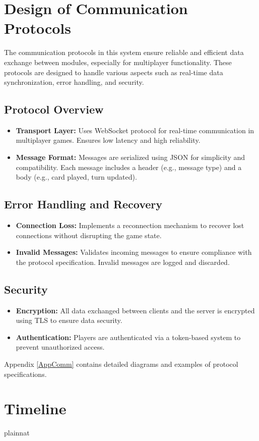 \documentclass[12pt, titlepage]{article}
\begin{document}
\section{Design of Communication Protocols}

The communication protocols in this system ensure reliable and efficient data exchange between modules, especially for multiplayer functionality. These protocols are designed to handle various aspects such as real-time data synchronization, error handling, and security.

\subsection{Protocol Overview}
\begin{itemize}
    \item \textbf{Transport Layer:} Uses WebSocket protocol for real-time communication in multiplayer games. Ensures low latency and high reliability.
    \item \textbf{Message Format:} Messages are serialized using JSON for simplicity and compatibility. Each message includes a header (e.g., message type) and a body (e.g., card played, turn updated).
\end{itemize}

\subsection{Error Handling and Recovery}
\begin{itemize}
    \item \textbf{Connection Loss:} Implements a reconnection mechanism to recover lost connections without disrupting the game state.
    \item \textbf{Invalid Messages:} Validates incoming messages to ensure compliance with the protocol specification. Invalid messages are logged and discarded.
\end{itemize}

\subsection{Security}
\begin{itemize}
    \item \textbf{Encryption:} All data exchanged between clients and the server is encrypted using TLS to ensure data security.
    \item \textbf{Authentication:} Players are authenticated via a token-based system to prevent unauthorized access.
\end{itemize}

Appendix \ref{AppComm} contains detailed diagrams and examples of protocol specifications.


\section{Timeline}



 {plainnat}


\newpage{}
\end{document}
